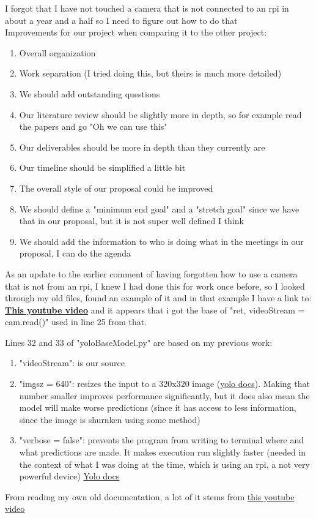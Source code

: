 \documentclass[12pt]{article}
\begin{document}
I forgot that I have not touched a camera that is not connected to an rpi in about a year and a half so I need to figure out how to do that
\\
Improvements for our project when comparing it to the other project: 
\begin{enumerate}
    \item Overall organization
    \item Work separation (I tried doing this, but theirs is much more detailed)
    \item We should add outstanding questions
    \item Our literature review should be slightly more in depth, so for example read the papers and go "Oh we can use this"
    \item Our deliverables should be more in depth than they currently are
    \item Our timeline should be simplified a little bit
    \item The overall style of our proposal could be improved 
    \item We should define a "minimum end goal" and a "stretch goal" since we have that in our proposal, but it is not super well defined I think
    \item We should add the information to who is doing what in the meetings in our proposal, I can do the agenda 
\end{enumerate}

As an update to the earlier comment of having forgotten how to use a camera that is not from an rpi, I knew I had done this for work once before, so I looked through my old files, found an example of it and in that example I have a link to: \underline{\textbf{\href{https://www.youtube.com/watch?v=rKcwcARdg9M&list=PLzMcBGfZo4-lUA8uGjeXhBUUzPYc6vZRn&index=4}{This youtube video}}} and it appears that i got the base of "ret, videoStream = cam.read()" used in line 25 from that.

Lines 32 and 33 of "yoloBaseModel.py" are based on my previous work:
\begin{enumerate}
    \item "videoStream": is our source
    \item "imgsz = 640": resizes the input to a 320x320 image (\href{https://docs.ultralytics.com/modes/train?h=arguments#train-settings}{yolo docs}). Making that number smaller improves performance significantly, but it does also mean the model will make worse predictions (since it has access to less information, since the image is shurnken using some method)
    \item "verbose = false": prevents the program from writing to terminal where and what predictions are made. It makes execution run slightly faster (needed in the context of what I was doing at the time, which is using an rpi, a not very powerful device) \href{https://docs.ultralytics.com/usage/cfg}{Yolo docs}
\end{enumerate} 
From reading my own old documentation, a lot of it stems from \href{https://www.youtube.com/watch?v=XKIm_R_rIeQ&list=PLRJVNUMAwcElierYZQCkbLG_jknYeevLz&index=5}{this youtube video} 
\end{document}
